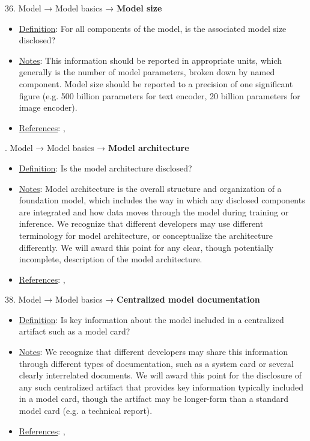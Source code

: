 36. Model → Model basics → \textbf{Model size}
\vspace{-\parskip}
\begin{itemize}
	\item
	\underline{Definition}: For all components of the model, is the associated model size disclosed?
	\item
	\underline{Notes}: This information should be reported in appropriate units, which generally is the number of model parameters, broken down by named component. Model size should be reported to a precision of one significant figure (e.g. 500 billion parameters for text encoder, 20 billion parameters for image encoder).
	\item
	\underline{References}: \citet{mitchell2019model}, \citet{crisan2022interactive}
\end{itemize} \vspace{\baselineskip}


. Model → Model basics → \textbf{Model architecture}
\vspace{-\parskip}
\begin{itemize}
	\item
	\underline{Definition}: Is the model architecture disclosed?
	\item
	\underline{Notes}: Model architecture is the overall structure and organization of a foundation model, which includes the way in which any disclosed components are integrated and how data moves through the model during training or inference. We recognize that different developers may use different terminology for model architecture, or conceptualize the architecture differently. We will award this point for any clear, though potentially incomplete, description of the model architecture.
	\item
	\underline{References}: \citet{mitchell2019model}, \citet{crisan2022interactive}
\end{itemize} \vspace{\baselineskip}


38. Model → Model basics → \textbf{Centralized model documentation}
\vspace{-\parskip}
\begin{itemize}
	\item
	\underline{Definition}: Is key information about the model included in a centralized artifact such as a model card?
	\item
	\underline{Notes}: We recognize that different developers may share this information through different types of documentation, such as a system card or several clearly interrelated documents. We will award this point for the disclosure of any such centralized artifact that provides key information typically included in a model card, though the artifact may be longer-form than a standard model card (e.g. a technical report).
	\item
	\underline{References}: \citet{mitchell2019model}, \citet{crisan2022interactive}
\end{itemize} \vspace{\baselineskip}


